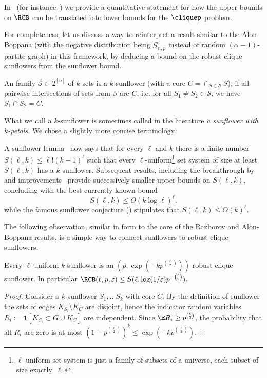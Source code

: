 In~ (for instance~) we provide a quantitative statement for how the upper bounds on $\RCB$ can be translated into lower bounds for the $\cliquep$ problem. 

For completeness, let us discuss a way to reinterpret a result similar to the Alon-Boppana (with the negative distribution being $\mathcal{G}_{n,p}$ instead of random $(\alpha-1)$-partite graph) in this framework, by deducing a bound on the robust clique sunflowers from the sunflower bound.

\begin{definition}[$k$-Sunflower]
    An family $\mathcal{S} \subset 2^{[n]}$ of $k$ sets is a $k$-sunflower (with a core $C = \cap_{S \in \mathcal{S}} S$), if all pairwise intersections of sets from $\mathcal{S}$ are $C$, i.e. for all $S_1 \not= S_2 \in \mathcal{S}$, we have $S_1 \cap S_2 = C$.
\end{definition}

What we call a $k$-sunflower is sometimes called in the literature \emph{a sunflower with $k$-petals}. We chose a slightly more concise terminology.

A sunflower lemma~\cite{erdos60} now says that for every $\ell$ and $k$ there is a finite number $S(\ell, k) \leq \ell! (k-1)^\ell$ such that every $\ell$-uniform\footnote{$\ell$-uniform set system is just a family of subsets of a universe, each subset of size exactly~$\ell$.} set system of size at least $S(\ell, k)$ has a $k$-sunflower. Subsequent results, including the breakthrough by~\cite{alweiss20} and improvements~\cite{bell2021note,Rao2020Coding,Tao2020sunflower, Hu2021sunflower, rao2023sunflowers} provide successively smaller upper bounds on $S(\ell, k)$, concluding with the best currently known bound
\begin{equation}
\label{eq:new-sunflower-numbers}
    S(\ell, k) \leq O(k \log \ell)^{\ell}.
\end{equation}
while the famous sunflower conjecture (\cite{erdos60}) stipulates that $S(\ell, k) \leq O(k)^\ell$.

The following observation, similar in form to the core of the Razborov and Alon-Boppana results, is a simple way to connect sunflowers to robust clique sunflowers.
\begin{lemma}
\label{lem:sunflower-is-clique-sunflower}
    Every $\ell$-uniform $k$-sunflower is an $(p, \exp(-k p^{\binom{\ell}{2}}))$-robust clique sunflower. In particular
    $\RCB(\ell, p, \varepsilon) \leq S(\ell, \log(1/\varepsilon) p^{-\binom{\ell}{2}})$.
\end{lemma}
\begin{proof}
    Consider a $k$-sunflower $S_1, \ldots S_k$ with core $C$. By the definition of sunflower the sets of edges $K_{S_i} \setminus K_{C}$ are disjoint, hence the indicator random variables
    $R_i := \mathbf{1}[K_{S_i} \subset G \cup K_C]$ are independent. Since $\E R_i \geq p^{\binom{\ell}{2}}$, the probability that all $R_i$ are zero is at most $(1 - p^{\binom{\ell}{2}})^k \leq \exp(-k p^{\binom{\ell}{2}})$.
\end{proof}

